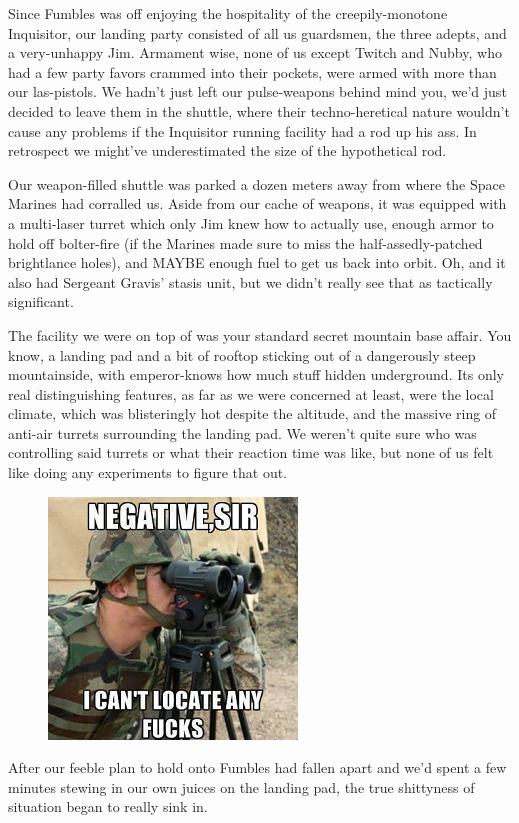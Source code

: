 Since Fumbles was off enjoying the hospitality of the creepily-monotone Inquisitor, our landing party consisted of all us guardsmen, the three adepts, and a very-unhappy Jim. 
Armament wise, none of us except Twitch and Nubby, who had a few party favors crammed into their pockets, were armed with more than our las-pistols. 
We hadn't just left our pulse-weapons behind mind you, we'd just decided to leave them in the shuttle, where their techno-heretical nature wouldn't cause any problems if the Inquisitor running facility had a rod up his ass. 
In retrospect we might've underestimated the size of the hypothetical rod.

Our weapon-filled shuttle was parked a dozen meters away from where the Space Marines had corralled us. 
Aside from our cache of weapons, it was equipped with a multi-laser turret which only Jim knew how to actually use, enough armor to hold off bolter-fire (if the Marines made sure to miss the half-assedly-patched brightlance holes), and MAYBE enough fuel to get us back into orbit. 
Oh, and it also had Sergeant Gravis' stasis unit, but we didn't really see that as tactically significant.

The facility we were on top of was your standard secret mountain base affair. 
You know, a landing pad and a bit of rooftop sticking out of a dangerously steep mountainside, with emperor-knows how much stuff hidden underground. 
Its only real distinguishing features, as far as we were concerned at least, were the local climate, which was blisteringly hot despite the altitude, and the massive ring of anti-air turrets surrounding the landing pad. 
We weren't quite sure who was controlling said turrets or what their reaction time was like, but none of us felt like doing any experiments to figure that out. 


\begin{figure}
	\begin{center}
		\includegraphics[width=\figwidth]{pics/16/5.png}
	\end{center}
\end{figure}
After our feeble plan to hold onto Fumbles had fallen apart and we'd spent a few minutes stewing in our own juices on the landing pad, the true shittyness of situation began to really sink in.

